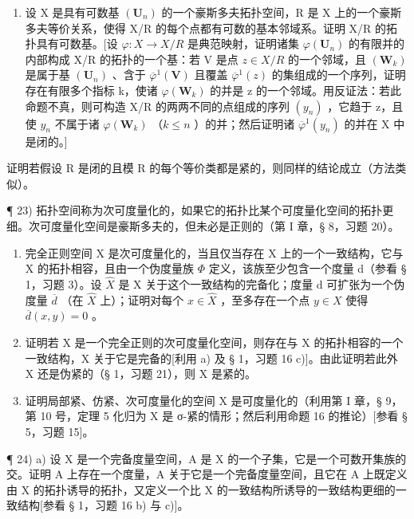 \begin{enumerate}
\def\labelenumi{\arabic{enumi})}
\setcounter{enumi}{21}
\tightlist
\item
  设 X 是具有可数基 \((\mathbf{U}_{n})\) 的一个豪斯多夫拓扑空间，R 是 X 上的一个豪斯多夫等价关系，使得 X/R 的每个点都有可数的基本邻域系。证明 X/R 的拓扑具有可数基。{[}设 \(\varphi: X \to X/R\) 是典范映射，证明诸集 \(\varphi(\mathbf{U}_{n})\) 的有限并的内部构成 X/R 的拓扑的一个基：若 V 是点 \(z \in X/R\) 的一个邻域，且 \((\mathbf{W}_{k})\) 是属于基 \((\mathbf{U}_{n})\) 、含于 \(\overline{\varphi}^{1}(\mathbf{V})\) 且覆盖 \(\overline{\varphi}^{1}(z)\) 的集组成的一个序列，证明存在有限多个指标 k，使诸 \(\varphi(\mathbf{W}_{k})\) 的并是 z 的一个邻域。用反证法：若此命题不真，则可构造 X/R 的两两不同的点组成的序列 \((y_{n})\) ，它趋于 z，且使 \(y_{n}\) 不属于诸 \(\varphi(\mathbf{W}_{k})\) （\(k \leqslant n\) ）的并；然后证明诸 \(\overline{\varphi}^{1}(y_{n})\) 的并在 X 中是闭的。{]}
\end{enumerate}

证明若假设 R 是闭的且模 R 的每个等价类都是紧的，则同样的结论成立（方法类似）。

¶ 23) 拓扑空间称为次可度量化的，如果它的拓扑比某个可度量化空间的拓扑更细。次可度量化空间是豪斯多夫的，但未必是正则的（第 I 章，§ 8，习题 20）。

\begin{enumerate}
\def\labelenumi{\alph{enumi})}
\item
  完全正则空间 X 是次可度量化的，当且仅当存在 X 上的一个一致结构，它与 X 的拓扑相容，且由一个伪度量族 \(\Phi\) 定义，该族至少包含一个度量 d（参看 § 1，习题 3）。设 \(\hat{X}\) 是 X 关于这个一致结构的完备化；度量 d 可扩张为一个伪度量 \(\overline{d}\) （在 \(\hat{X}\) 上）；证明对每个 \(x \in \hat{X}\) ，至多存在一个点 \(y \in X\) 使得 \(\overline{d}(x, y) = 0\) 。
\item
  证明若 X 是一个完全正则的次可度量化空间，则存在与 X 的拓扑相容的一个一致结构，X 关于它是完备的{[}利用 a) 及 § 1，习题 16 c){]}。由此证明若此外 X 还是伪紧的（§ 1，习题 21），则 X 是紧的。
\item
  证明局部紧、仿紧、次可度量化的空间 X 是可度量化的（利用第 I 章，§ 9，第 10 号，定理 5 化归为 X 是 σ-紧的情形；然后利用命题 16 的推论）{[}参看 § 5，习题 15{]}。
\end{enumerate}

¶ 24) a) 设 X 是一个完备度量空间，A 是 X 的一个子集，它是一个可数开集族的交。证明 A 上存在一个度量，A 关于它是一个完备度量空间，且它在 A 上既定义由 X 的拓扑诱导的拓扑，又定义一个比 X 的一致结构所诱导的一致结构更细的一致结构{[}参看 § 1，习题 16 b) 与 c){]}。

